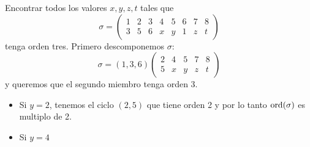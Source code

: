 \begin{ej} %
    Encontrar todos los valores $x, y, z, t$ tales que 
    \[
        \sigma =
        \begin{pmatrix}
            1 & 2 & 3 & 4 & 5 & 6 & 7 & 8 \\
            3 & 5 & 6 & x & y & 1 & z & t
        \end{pmatrix}
    \]
    tenga orden tres.
    Primero descomponemos $\sigma$:
    \[
        \sigma = (1, 3, 6)
        \begin{pmatrix}
            2 & 4 & 5 & 7 & 8 \\
            5 & x & y & z & t
        \end{pmatrix}
    \]
    y queremos que el segundo miembro tenga orden 3.

    \begin{itemize}
        \item Si $y = 2$, tenemos el ciclo $(2, 5)$ que tiene orden 2 y por lo tanto $\operatorname{ord}(\sigma)$
            es multiplo de 2.
        \item Si $y = 4$ 
    \end{itemize}
\end{ej}
